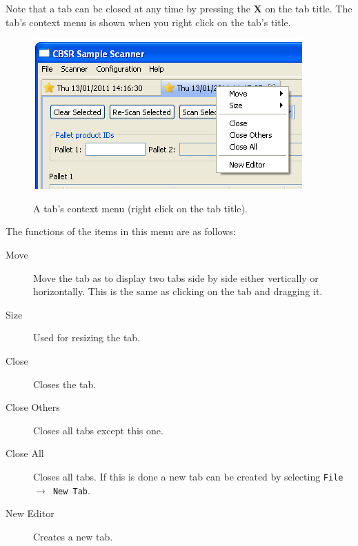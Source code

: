Note that a tab can be closed at any time by pressing the \textbf{X} on the tab
title. The tab's context menu is shown when you right click on the tab's title.
\begin{figure}[H]
  \centering
  \scalebox{0.35}
	   { \includegraphics*{screenshots/scan_and_decode/tab_context_menu} }
	   \caption{A tab's context menu (right click on the tab title).}
	   \label{fig:tab_context_menu}
\end{figure}

The functions of the items in this menu are as follows:
\begin{description}
\item [Move] Move the tab as to display two tabs side by side either vertically
  or horizontally. This is the same as clicking on the tab and dragging it.
\item [Size] Used for resizing the tab.
\item [Close] Closes the tab.
\item [Close Others] Closes all tabs except this one.
\item [Close All]  Closes all tabs. If this is done a new tab can be created by
  selecting \texttt{File $\to$ New Tab}.
\item [New Editor] Creates a new tab.
\end{description}
